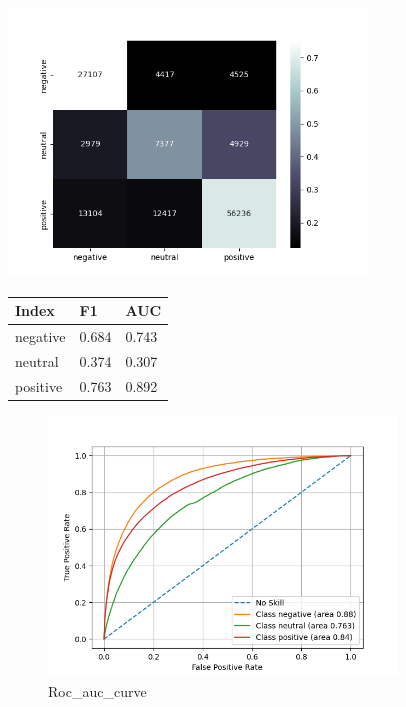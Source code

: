 \documentclass{article}%
\begin{document}
{\begin{minipage}[c]{0.95\textwidth}
\begin{minipage}{0.55\textwidth}
\end{minipage}%
\end{minipage}%
\linebreak%
\begin{minipage}{0.7\textwidth}%
\begin{minipage}{0.8\textwidth}%
\includegraphics[width=360px]{./report/Learning/Logistic_Regression/confusion-matrix.png}%
\end{minipage}%
\begin{minipage}{0.5\textwidth}%
\begin{tabu}[t]{X[r] | X[r] X[r]}%
\hline%
\textbf{Index}&\textbf{F1}&\textbf{AUC}\\%
\hline%
negative&0.684&0.743\\%
neutral&0.374&0.307\\%
positive&0.763&0.892\\%
\end{tabu}%
\end{minipage}%
\end{minipage}%


\begin{figure}[h!]%
\centering%
\includegraphics[width=350px]{./report/Learning/Logistic_Regression/True-Positive-Rate.png}%
\caption{Roc\_auc\_curve}%
\end{figure}

}
\end{document}

